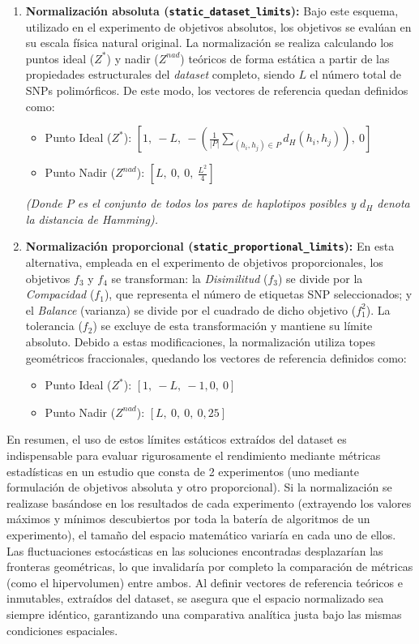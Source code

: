 \begin{enumerate}
    \item \textbf{Normalización absoluta (\texttt{static\_dataset\_limits}):} Bajo este esquema, utilizado en el experimento de objetivos absolutos, los objetivos se evalúan en su escala física natural original. La normalización se realiza calculando los puntos ideal ($Z^*$) y nadir ($Z^{nad}$) teóricos de forma estática a partir de las propiedades estructurales del \textit{dataset} completo, siendo $L$ el número total de SNPs polimórficos. De este modo, los vectores de referencia quedan definidos como:
    \begin{itemize}
        \item Punto Ideal ($Z^*$): $\left[1,\ -L,\ -\left(\frac{1}{|P|} \sum_{(h_i, h_j) \in P} d_H(h_i, h_j)\right),\ 0\right]$
        \item Punto Nadir ($Z^{nad}$): $\left[L,\ 0,\ 0,\ \frac{L^2}{4}\right]$
    \end{itemize}
    \textit{(Donde $P$ es el conjunto de todos los pares de haplotipos posibles y $d_H$ denota la distancia de Hamming).}

    \item \textbf{Normalización proporcional (\texttt{static\_proportional\_limits}):} En esta alternativa, empleada en el experimento de objetivos proporcionales, los objetivos $f_3$ y $f_4$ se transforman: la \textit{Disimilitud} ($f_3$) se divide por la \textit{Compacidad} ($f_1$), que representa el número de etiquetas SNP seleccionados; y el \textit{Balance} (varianza) se divide por el cuadrado de dicho objetivo ($f_1^2$). La tolerancia ($f_2$) se excluye de esta transformación y mantiene su límite absoluto. Debido a estas modificaciones, la normalización utiliza topes geométricos fraccionales, quedando los vectores de referencia definidos como:
    \begin{itemize}
        \item Punto Ideal ($Z^*$): $\left[1,\ -L,\ -1{,}0,\ 0\right]$
        \item Punto Nadir ($Z^{nad}$): $\left[L,\ 0,\ 0,\ 0{,}25\right]$
    \end{itemize}
\end{enumerate}



En resumen, el uso de estos límites estáticos extraídos del dataset es indispensable para evaluar rigurosamente el rendimiento mediante métricas estadísticas en un estudio que consta de 2 experimentos (uno mediante formulación de objetivos absoluta y otro proporcional). Si la normalización se realizase basándose en los resultados de cada experimento (extrayendo los valores máximos y mínimos descubiertos por toda la batería de algoritmos de un experimento), el tamaño del espacio matemático variaría en cada uno de ellos. Las fluctuaciones estocásticas en las soluciones encontradas desplazarían las fronteras geométricas, lo que invalidaría por completo la comparación de métricas (como el hipervolumen) entre ambos. Al definir vectores de referencia teóricos e inmutables, extraídos del dataset, se asegura que el espacio normalizado sea siempre idéntico, garantizando una comparativa analítica justa bajo las mismas condiciones espaciales.

